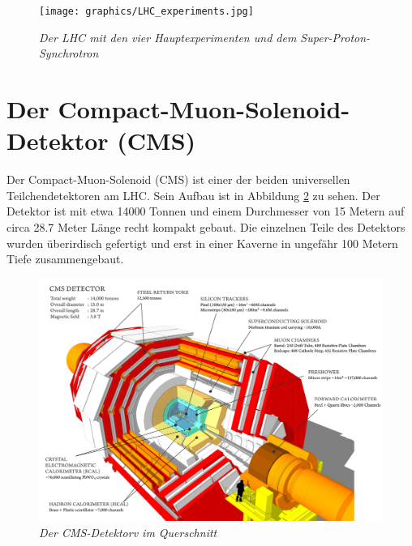 \begin{figure}[hhh]
 \begin{center}
   \texttt{[image: graphics/LHC\_experiments.jpg]}
   \parbox[b]{12cm}{
     \caption[Large-Hadron-Collider]
             {\label{fig:LHC} \it\!Der LHC mit den vier Hauptexperimenten und dem Super-Proton-Synchrotron \cite{Team:40525}}
   }
 \end{center}
\end{figure}

\section{Der Compact-Muon-Solenoid-Detektor (CMS)}
\label{ch:Experiment:sec:CMS}

Der Compact-Muon-Solenoid (CMS) ist einer der beiden universellen Teilchendetektoren am LHC. Sein Aufbau ist in Abbildung \ref{fig:cms_sectional} zu sehen. Der Detektor ist mit etwa \num{14000} Tonnen und einem Durchmesser von \num{15} Metern auf circa \num{28,7} Meter L\"ange recht kompakt gebaut. Die einzelnen Teile des Detektors wurden \"uberirdisch gefertigt und erst in einer Kaverne in ungef\"ahr \num{100} Metern Tiefe zusammengebaut.\\
\begin{figure}[hhh]
 \begin{center}
   \includegraphics[width=\textwidth]{graphics/cms_sectional.png}
   \parbox[b]{12cm}{
     \caption[CMS-Detektor]
             {\label{fig:cms_sectional} \it\!Der CMS-Detektorv im Querschnitt \cite{cms_sectional}}
   }
 \end{center}
\end{figure}

